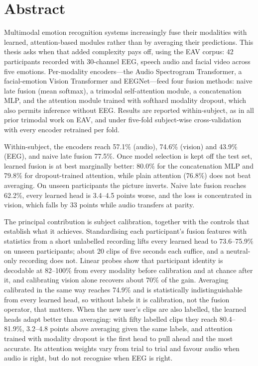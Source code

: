 \section*{Abstract}
Multimodal emotion recognition systems increasingly fuse their modalities with learned, attention-based modules rather than by averaging their predictions. This thesis asks when that added complexity pays off, using the EAV corpus: 42 participants recorded with 30-channel EEG, speech audio and facial video across five emotions. Per-modality encoders---the Audio Spectrogram Transformer, a facial-emotion Vision Transformer and EEGNet---feed four fusion methods: naive late fusion (mean softmax), a trimodal self-attention module, a concatenation MLP, and the attention module trained with softhard modality dropout, which also permits inference without EEG. Results are reported within-subject, as in all prior trimodal work on EAV, and under five-fold subject-wise cross-validation with every encoder retrained per fold.

Within-subject, the encoders reach 57.1\% (audio), 74.6\% (vision) and 43.9\% (EEG), and naive late fusion 77.5\%. Once model selection is kept off the test set, learned fusion is at best marginally better: 80.0\% for the concatenation MLP and 79.8\% for dropout-trained attention, while plain attention (76.8\%) does not beat averaging. On unseen participants the picture inverts. Naive late fusion reaches 62.2\%, every learned head is 3.4--4.5 points worse, and the loss is concentrated in vision, which falls by 33 points while audio transfers at parity.

The principal contribution is subject calibration, together with the controls that establish what it achieves. Standardising each participant's fusion features with statistics from a short unlabelled recording lifts every learned head to 73.6--75.9\% on unseen participants; about 20 clips of five seconds each suffice, and a neutral-only recording does not. Linear probes show that participant identity is decodable at 82--100\% from every modality before calibration and at chance after it, and calibrating vision alone recovers about 70\% of the gain. Averaging calibrated in the same way reaches 74.9\% and is statistically indistinguishable from every learned head, so without labels it is calibration, not the fusion operator, that matters. When the new user's clips are also labelled, the learned heads adapt better than averaging: with fifty labelled clips they reach 80.4--81.9\%, 3.2--4.8 points above averaging given the same labels, and attention trained with modality dropout is the first head to pull ahead and the most accurate. Its attention weights vary from trial to trial and favour audio when audio is right, but do not recognise when EEG is right.

